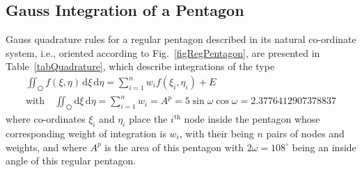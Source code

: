 \subsection{Gauss Integration of a Pentagon}

Gauss quadrature rules for a regular pentagon described in its natural co-ordinate system, i.e., oriented according to Fig.~\ref{figRegPentagon}, are presented in Table~\ref{tabQuadrature}, which describe integrations of the type
\begin{multline}
    \iint_{\pentagon} f ( \xi , \eta) \, \mathrm{d} \xi \, \mathrm{d} \eta = 
    \sum_{i=1}^n w_i f ( \xi_i , \eta_i ) + E \\
    \text{with} \quad
    \iint_{\pentagon} \mathrm{d} \xi \, \mathrm{d} \eta = \sum_{i=1}^n w_i =
    A^p = 5 \sin \omega \cos \omega = 2.3776412907378837 
\end{multline}
where co-ordinates $\xi_i$ and $\eta_i$ place the $i^{\text{th}}$ node inside the pentagon whose corresponding weight of integration is $w_i$, with their being $n$ pairs of nodes and weights, and where $A^p$ is the area of this pentagon with $2 \omega = 108^{\circ}$ being an inside angle of this regular pentagon. 

